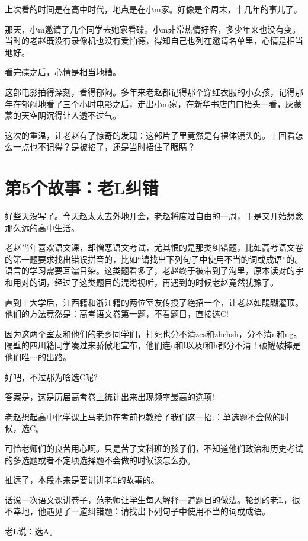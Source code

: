 \documentclass[openany]{ctexbook}
\begin{document}
上次看的时间是在高中时代，地点是在小m家。好像是个周末，十几年的事儿了。

那天，小m邀请了几个同学去她家看碟。小m非常热情好客，多少年来也没有变。当时的老赵既没有录像机也没有爱怕德，得知自己也列在邀请名单里，心情是相当地好。

看完碟之后，心情是相当地糟。

这部电影拍得深刻，看得郁闷。多年来老赵都记得那个穿红衣服的小女孩，记得那年在郁闷地看了三个小时电影之后，走出小m家，在新华书店门口抬头一看，灰蒙蒙的天空阴沉得让人透不过气。

这次的重温，让老赵有了惊奇的发现：这部片子里竟然是有裸体镜头的。上回看怎么一点也不记得？是被掐了，还是当时捂住了眼睛？

\chapter*{第5个故事：老L纠错}\label{l5}

好些天没写了。今天赵太太去外地开会，老赵将度过自由的一周，于是又开始想念那久远的高中生活。

老赵当年喜欢语文课，却憎恶语文考试，尤其恨的是那类纠错题，比如高考语文卷的第一题要求找出错误拼音的，比如``请找出下列句子中使用不当的词或成语''的。语言的学习需要耳濡目染。这类题看多了，老赵终于被带到了沟里，原本读对的字和用对的词，经过了这类题目的混淆视听，再遇到的时候老赵竟然犹豫了。

直到上大学后，江西籍和浙江籍的两位室友传授了绝招一个，让老赵如醍醐灌顶。他们的方法竟然是：高考语文卷第一题，不看题目，直接选C!

因为这两个室友和他们的老乡同学们，打死也分不清zcs和zhchsh，分不清n和ng。隔壁的四川籍同学凑过来骄傲地宣布，他们连n和l以及f和h都分不清！破罐破摔是他们唯一的出路。

好吧，不过那为啥选C呢?

答案是，这是历届高考卷上统计出来出现频率最高的选项!

老赵想起高中化学课上马老师在考前也教给了我们这一招:：单选题不会做的时候，选C。

可怜老师们的良苦用心啊。只是苦了文科班的孩子们，不知道他们政治和历史考试的多选题或者不定项选择题不会做的时候该怎么办。

扯远了，本段本来是要讲讲老L的故事的。

话说一次语文课讲卷子，范老师让学生每人解释一道题目的做法。轮到的老L，很不幸地，他遇见了一道纠错题：请找出下列句子中使用不当的词或成语。

老L说：选A。
\end{document}
